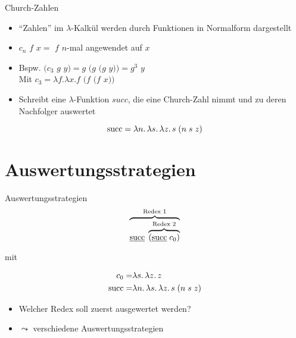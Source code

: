 \documentclass{beamer}
\begin{document}
\begin{frame}{Church-Zahlen}
	\begin{itemize}
		\item \enquote{Zahlen} im $\lambda$-Kalkül werden durch Funktionen in Normalform dargestellt
		\item $c_n$ $f$ $x =$ $f$ $n$-mal angewendet auf $x$
		\item Bspw. $(c_3$ $g$ $y) = g$ $(g $ $(g$ $y)) = g^3$ $y$\\
		      Mit $c_3 = \lambda{}f.\lambda{}x.f$ $(f $ $(f$ $x))$
		\item Schreibt eine $\lambda$-Funktion $succ$, die eine Church-Zahl nimmt und zu deren Nachfolger auswertet
              \end{itemize}
              \pause

              \begin{equation*}
                \csucc = \lam{n}{\lam{s}{\lam{z}{
                  \app{s}{(
                    \app{n}{\app{s}{z}}
                  )}
                }}}
              \end{equation*}
\end{frame}

\section{Auswertungsstrategien}

\begin{frame}{Auswertungsstrategien}
        \begin{equation*}
          \overbrace{\app{
              \uline{\csucc}
            }{
              \overbrace{(\app{\uline{\csucc}}{\cn{0}})}^{\text{Redex 2}}
            }}^{\text{Redex 1}}
        \end{equation*}

        mit

        \begin{eqnarray*}
          c_{0} =& \lambda s.\, \lambda z.\, z \\
          \text{succ} =& \lambda n.\, \lambda s.\, \lambda z.\, s\;(n\;s\;z)
        \end{eqnarray*}

	\begin{itemize}
		\item Welcher Redex soll zuerst ausgewertet werden?
		\item $\leadsto$ verschiedene Auswertungsstrategien
	\end{itemize}
\end{frame}
\end{document}
